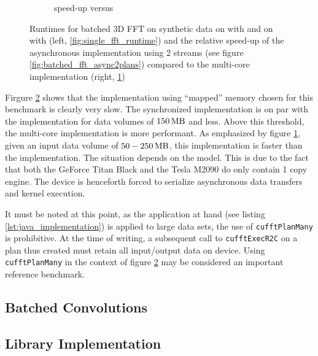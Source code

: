 \begin{figure}[h]
\begin{subfigure}[b]{0.45\textwidth}
    \caption{\gpu{} speed-up versus \cpu{}}
    \label{fig:batched_fft_speed_up}
  \end{subfigure}
  \hfill
  \caption{Runtimes for batched 3D FFT on synthetic data on \cpu{} with \fftw{} and on \gpu{} with \cufft{} (left, \ref{fig:single_fft_runtime}) and the relative speed-up of the asynchronous \gpu{} implementation using 2 streams (see figure \ref{fig:batched_fft_async2plans}) compared to the multi-core \cpu{} implementation (right, \ref{fig:batched_fft_speed_up})}
  \label{fig:rt_batched_fft}
\end{figure}


Firgure \ref{fig:rt_batched_fft} shows that the implementation using ``mapped'' memory chosen for this benchmark is clearly very slow. The synchronized implementation is on par with the \cpu{} implementation for data volumes of $\unit[150]{MB}$ and less. Above this threshold, the multi-core implementation is more performant. As emphasized by figure \ref{fig:batched_fft_speed_up}, given an input data volume of $\unit[50-250]{MB}$, this implementation is faster than the \cpu{} implementation. The situation depends on the \gpu{} model. This is due to the fact that both the GeForce Titan Black and the Tesla M2090 do only contain 1 copy engine. The device is henceforth forced to serialize asynchronous data transfers and kernel execution.\newline

It must be noted at this point, as the application at hand (see listing \ref{lst:java_implementation}) is applied to large data sets, the use of \texttt{cufftPlanMany} is prohibitive. At the time of writing, a subsequent call to \texttt{cufftExecR2C} on a plan thus created must retain all input/output data on device. Using \texttt{cufftPlanMany} in the context of figure \ref{fig:rt_batched_fft} may be considered an important reference benchmark.

\subsection{Batched Convolutions}


\subsection{Library Implementation}


